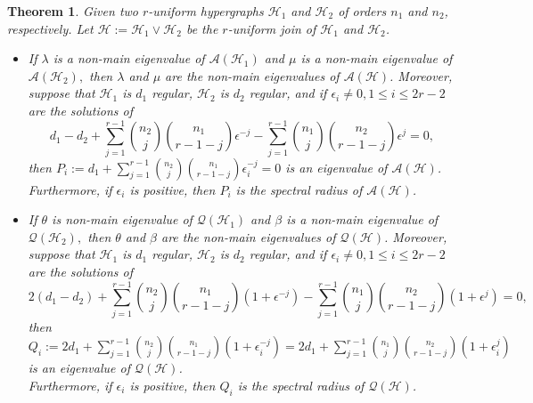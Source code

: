 \documentclass[10pt,a4paper]{article}
\newtheorem{corollary}{Corollary}[section]
\newtheorem{theorem}{Theorem}[section]
\begin{document}
	
	
	
	\begin{theorem}
		Given two $r$-uniform hypergraphs  $\mathcal{H}_1$ and $\mathcal{H}_2$ of orders $n_1$ and $n_2$, respectively.
		Let $\mathcal{H}:=\mathcal{H}_1 \vee \mathcal{H}_2$ be the $r$-uniform join of $\mathcal{H}_1$ and $\mathcal{H}_2$.
		\begin{itemize}
			\item If  $\lambda$ is a non-main eigenvalue of $\mathcal{A}({\mathcal{H}_1})$ and $\mu$ is a non-main eigenvalue of $\mathcal{A}({\mathcal{H}_2}),$ then $\lambda$ and $\mu$ are the non-main eigenvalues of $\mathcal{A}(\mathcal{H})$.
			Moreover, suppose that $\mathcal{H}_1$ is $d_1$ regular, $\mathcal{H}_2$ is $d_2$ regular, and if  $ \epsilon_i \neq 0, 1 \leq i \leq 2r-2$ are the solutions of \begin{equation*}
				d_1-d_2 + \sum\limits_{j=1}^{r-1} \binom{n_2}{j}\binom{n_1}{r-1-j} \epsilon^{-j} -\sum\limits_{j=1}^{r-1} \binom{n_1}{j}\binom{n_2}{r-1-j} \epsilon^{j}=0,     \label{eqn_join_adjacency}    
			\end{equation*} 
			then $P_i:=d_1+ \sum\limits_{j=1}^{r-1} \binom{n_2}{j}\binom{n_1}{r-1-j} \epsilon_i^{-j} = 0 $ is an eigenvalue of $\mathcal{A}(\mathcal{H})$.\\
			Furthermore, if $\epsilon_i$ is positive, then $P_i$ is the spectral radius of $\mathcal{A}(\mathcal{H})$.
			\item If  $\theta$ is  non-main eigenvalue of $\mathcal{Q}({\mathcal{H}_1})$ and $\beta$ is a non-main eigenvalue of $\mathcal{Q}({\mathcal{H}_2}),$ then $\theta$ and $\beta$ are the non-main eigenvalues of $\mathcal{Q}(\mathcal{H})$. 
			Moreover, suppose that $\mathcal{H}_1$ is $d_1$ regular, $\mathcal{H}_2$ is $d_2$ regular, and if  $ \epsilon_i \neq 0, 1 \leq i \leq 2r-2$ are the solutions of 
			\begin{equation*}
				2(d_1-d_2) + \sum\limits_{j=1}^{r-1} \binom{n_2}{j}\binom{n_1}{r-1-j} (1+\epsilon^{-j}) -\sum\limits_{j=1}^{r-1} \binom{n_1}{j}\binom{n_2}{r-1-j} (1+\epsilon^{j})=0, \label{eqn_join_signless} 
			\end{equation*} then $Q_i:= 2d_1+ \sum\limits_{j=1}^{r-1} \binom{n_2}{j}\binom{n_1}{r-1-j} (1+\epsilon_i^{-j}) =  2d_1+ \sum\limits_{j=1}^{r-1} \binom{n_1}{j}\binom{n_2}{r-1-j} (1+\epsilon_i^{j})$ is an eigenvalue of $\mathcal{Q}(\mathcal{H})$.\\
			Furthermore, if $\epsilon_i$ is positive, then $Q_i$ is the spectral radius of $\mathcal{Q}(\mathcal{H})$.
		\end{itemize}  
	\end{theorem}
\end{document}
